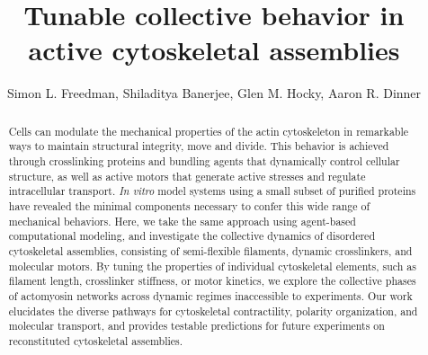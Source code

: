 \documentclass[12pt]{article}
\begin{document}
\title{Tunable collective behavior in active cytoskeletal assemblies}
\author{Simon L. Freedman, Shiladitya Banerjee, Glen M. Hocky, Aaron R. Dinner}
\date{}
\maketitle
\begin{abstract}
  Cells can modulate the mechanical properties of the actin cytoskeleton in 
  remarkable ways to maintain structural  integrity, move and divide. This 
  behavior is achieved through crosslinking proteins and bundling agents that 
  dynamically control cellular structure, as well as active motors that generate
  active stresses and regulate intracellular transport. {\em In vitro} model 
  systems using a small subset of purified proteins have  revealed the minimal 
  components necessary to confer this wide range of mechanical behaviors. Here, 
  we take the same  approach using agent-based  computational modeling, and 
  investigate the collective dynamics of disordered   cytoskeletal assemblies, 
  consisting of  semi-flexible filaments, dynamic crosslinkers, and molecular 
  motors. By tuning  the properties of individual  cytoskeletal elements, such 
  as filament length, crosslinker stiffness, or motor kinetics, we explore the
  collective  phases of actomyosin networks across dynamic regimes inaccessible 
  to experiments. Our work elucidates the diverse pathways for cytoskeletal 
  contractility, polarity organization, and molecular transport, and provides 
  testable predictions for future experiments on reconstituted cytoskeletal 
  assemblies.  
\end{abstract}
\end{document}
